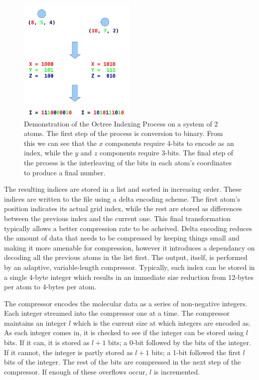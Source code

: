 \documentclass[a4paper,11pt]{report}
\begin{document}
\begin{figure}
 \center
 \includegraphics[width=0.5\textwidth]{resources/OctreeIndexingVerticalCropped.png}
\caption{Demonstration of the Octree Indexing Process on a system of 2 atoms. The first step of the process is conversion to binary. From this we can see that the $x$ components require 4-bits to encode as an index, while the $y$ and $z$ components require 3-bits. The final step of the prcoess is the interleaving of the bits in each atom's coordinates to produce a final number. }
\label{octree}
\end{figure}

The resulting indices are stored in a list and sorted in increasing order. These indices are written to the file using a delta encoding scheme. The first atom's position indicates its actual grid index, while the rest are stored as differences between the previous index and the current one. This final transformation typically allows a better compression rate to be acheived. Delta encoding reduces the amount of data that needs to be compressed by keeping things small and making it more amenable for compression, however it introduces a dependancy on decoding all the previous atoms in the list first. The output, itself, is performed by an adaptive, variable-length compressor. Typically, each index can be stored in a single 4-byte integer which results in an immediate size reduction from 12-bytes per atom to 4-bytes per atom. 

The compressor encodes the molecular data as a series of non-negative integers. Each integer streamed into the compressor one at a time. The compressor maintains an integer $l$ which is the current size at which integers are encoded as. As each integer comes in, it is checked to see if the integer can be stored using $l$ bits. If it can, it is stored as $l+1$ bits; a 0-bit followed by the bits of the integer. If it cannot, the integer is partly stored as $l+1$ bits; a 1-bit followed the first $l$ bits of the integer. The rest of the bits are compressed in the next step of the compressor. If enough of these overflows occur, $l$ is incremented.
\end{document}
